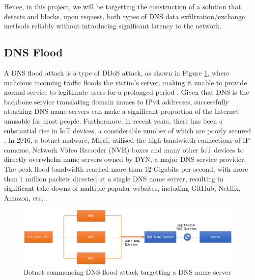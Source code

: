 \documentclass[a4paper]{report}
\begin{document}
Hence, in this project, we will be targetting the construction of a solution that detects and blocks, upon request, both types of DNS data exfiltration/exchange methods reliably without introducing significant latency to the network.

\subsection{DNS Flood}
\label{section:background-dnsflood}

A DNS flood attack is a type of DDoS attack, as shown in Figure \ref{fig:dns-flood}, where malicious incoming traffic floods the victim's server, making it unable to provide normal service to legitimate users for a prolonged period \cite{cloudflare-dns-flood}. Given that DNS is the backbone service translating domain names to IPv4 addresses, successfully attacking DNS name servers can make a significant proportion of the Internet unusable for most people. Furthermore, in recent years, there has been a substantial rise in IoT devices, a considerable number of which are poorly secured \cite{mahjabin-2019}. In 2016, a botnet malware, Mirai\cite{bisson-2016}, utilised the high-bandwidth connections of IP cameras, Network Video Recorder (NVR) boxes and many other IoT devices to directly overwhelm name servers owned by DYN, a major DNS service provider. The peak flood bandwidth reached more than $12$ Gigabits per second, with more than $1$ million packets directed at a single DNS name server, resulting in significant take-downs of multiple popular websites, including GitHub, Netflix, Amazon, etc. \cite{bisson-2016, akamai-dns-flood}.

\begin{figure}[h!]
  \includegraphics[width=\textwidth]{imgs/dns-flood.png}
  \caption{Botnet commencing DNS flood attack targetting a DNS name server}
  \label{fig:dns-flood}
\end{figure}
\end{document}
